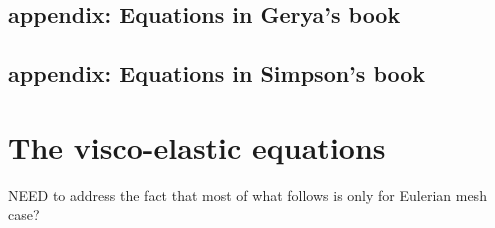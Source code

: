 \newpage
\subsection{appendix: Equations in Gerya's book} 

\newpage
\subsection{appendix: Equations in Simpson's book} 



\newpage
\section{The visco-elastic equations}

NEED to address the fact that most of what follows is only for Eulerian mesh case?

\vspace{1cm}









